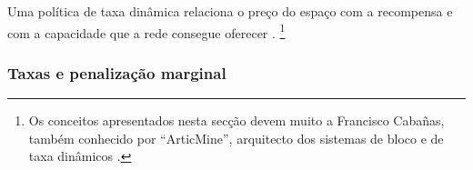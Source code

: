 Uma política de taxa dinâmica relaciona o preço do espaço com a recompensa e com a
capacidade que a rede consegue oferecer
\cite{articmine-fee-video,articmine-36c3-dynamics,articmine-defcon27-video}.
\footnote{Os conceitos apresentados nesta secção devem muito a Francisco
Cabañas, também conhecido por ``ArticMine'', arquitecto dos sistemas de bloco
e de taxa dinâmicos \cite{articmine-fee-video,articmine-36c3-dynamics,
articmine-defcon27-video}.}



\subsubsection*{Taxas e penalização marginal}

